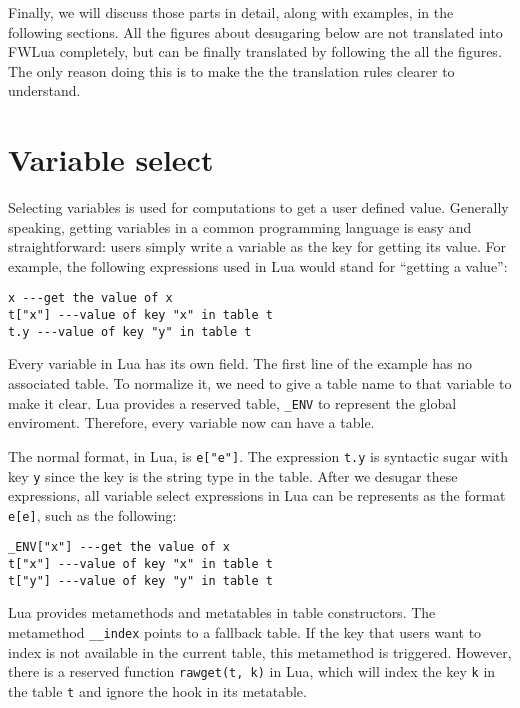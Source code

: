Finally, we will discuss those parts in detail, along with examples, in the following sections. All the figures about desugaring below are not translated into FWLua completely, but can be finally translated by following the all the figures. The only reason doing this is to make the the translation rules clearer to understand.



\section{Variable select}
Selecting variables is used for computations to get a user defined value. Generally speaking, getting variables in a common programming language is easy and straightforward: users simply write a variable as the key for getting its value. For example, the following expressions used in Lua would stand for ``getting a value'':

\begin{verbatim}
x ---get the value of x
t["x"] ---value of key "x" in table t
t.y ---value of key "y" in table t
\end{verbatim}

Every variable in Lua has its own field. 
The first line of the example has no associated table.
To normalize it, we need to give a table name to that variable to make it clear.
Lua provides a reserved table, {\tt \_ENV} to represent the global enviroment. Therefore, every variable now can have a table.

The normal format, in Lua, is {\tt e["e"]}. 
The expression {\tt t.y} is syntactic sugar with key {\tt y} since the key is the string type in the table. After we desugar these expressions, all variable select expressions in Lua can be represents as the format {\tt e[e]}, such as the following:

\begin{verbatim}
_ENV["x"] ---get the value of x
t["x"] ---value of key "x" in table t
t["y"] ---value of key "y" in table t
\end{verbatim}

Lua provides metamethods and metatables in table constructors. The metamethod {\tt \_\_index} points to a fallback table. If the key that users want to index is not available in the current table, this metamethod is triggered. However, there is a reserved function {\tt rawget(t, k)} in Lua, which will index the key {\tt k} in the table {\tt t} and ignore the hook in its metatable.

